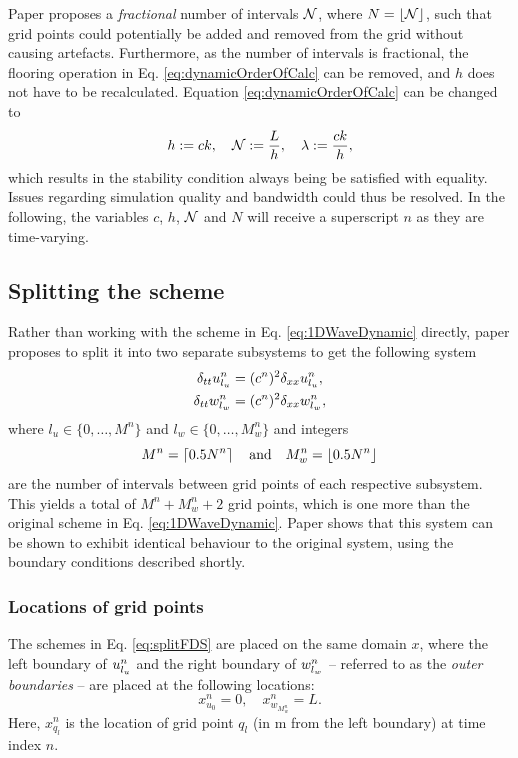 Paper \citeP[G] proposes a \textit{fractional} number of intervals $\mathcal{N}$, where $N = \floor[\Nfrac]$, such that grid points could potentially be added and removed from the grid without causing artefacts. Furthermore, as the number of intervals is fractional, the flooring operation in Eq. \eqref{eq:dynamicOrderOfCalc} can be removed, and $h$ does not have to be recalculated. Equation \eqref{eq:dynamicOrderOfCalc} can be changed to
\begin{equation}\label{eq:newOrderOfCalc}
    h:= ck, \quad \mathcal{N} := \frac{L}{h}, \quad \lambda := \frac{ck}{h},
\end{equation}  
which results in the stability condition always being be satisfied with equality. Issues regarding simulation quality and bandwidth could thus be resolved. In the following, the variables $c$, $h$, $\mathcal{N}$ and $N$ will receive a superscript $n$ as they are time-varying.

\subsection{Splitting the scheme}
Rather than working with the scheme in Eq. \eqref{eq:1DWaveDynamic} directly, paper \citeP[G] proposes to split it into two separate subsystems to get the following system 
\begin{subequations}\label{eq:splitFDS}
    \begin{align}
        \delta_{tt} u_{l_u}^n &= (c^n)^2\delta_{xx} u_{l_u}^n,\\
        \delta_{tt} w_{l_w}^n &= (c^n)^2\delta_{xx} w_{l_w}^n,
    \end{align}
\end{subequations}
where $l_u \in \{0, \hdots, M^n\}$ and $l_w \in \{0, \hdots, M_w^n\}$ and integers 
\begin{equation}
    M^n =\ceil[0.5 N^n] \qaq M_w^n =\floor[0.5 N^n]
\end{equation}
are the number of intervals between grid points of each respective subsystem. This yields a total of $M^n + M_w^n + 2$ grid points, which is one more than the original scheme in Eq. \eqref{eq:1DWaveDynamic}. Paper \citeP[G] shows that this system can be shown to exhibit identical behaviour to the original system, using the boundary conditions described shortly.

\subsubsection{Locations of grid points}
The schemes in Eq. \eqref{eq:splitFDS} are placed on the same domain $x$, where the left boundary of $u_{l_u}^n$ and the right boundary of $w_{l_w}^n$ -- referred to as the \textit{outer boundaries} -- are placed at the following locations:
\begin{equation}\label{eq:outerBoundaries}
    x_{u_0}^n = 0, \quad x_{w_{M_w^n}}^n = L.
\end{equation}
Here, $x_{q_l}^n$ is the location of grid point $q_l$ (in m from the left boundary) at time index $n$.

